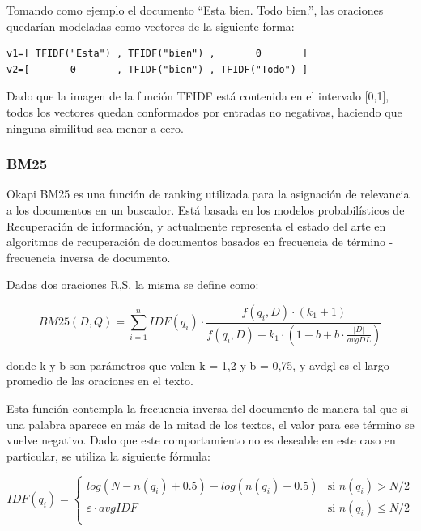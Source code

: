 \documentclass[a4paper]{article}
\begin{document}
Tomando como ejemplo el documento “Esta bien. Todo bien.”, las oraciones quedarían modeladas como vectores de la siguiente forma:

\begin{Verbatim}[xleftmargin=3em]
v1=[ TFIDF("Esta") , TFIDF("bien") ,       0       ]
v2=[       0       , TFIDF("bien") , TFIDF("Todo") ]
\end{Verbatim}

Dado que la imagen de la función TFIDF está contenida en el intervalo [0,1], todos los vectores quedan conformados por entradas no negativas, haciendo que ninguna similitud sea menor a cero. 


\subsubsection{BM25}
Okapi BM25 es una función de ranking utilizada para la asignación de relevancia a los documentos en un buscador. Está basada en los modelos probabilísticos de Recuperación de información, y actualmente representa el estado del arte en algoritmos de recuperación de documentos basados en frecuencia de término - frecuencia inversa de documento.

Dadas dos oraciones R,S, la misma se define como:

\begin{equation}
BM25(D,Q) = \sum_{i=1}^{n} IDF(q_i) \cdot \frac{f(q_i, D) \cdot (k_1 + 1)}{f(q_i, D) + k_1 \cdot (1 - b + b \cdot \frac{|D|}{avgDL})}
\end{equation}

donde k y b son parámetros que valen k = 1,2 y b = 0,75, y avdgl es el largo promedio de las oraciones en el texto.

Esta función contempla la frecuencia inversa del documento de manera tal que si una palabra aparece en más de la mitad de los textos, el valor para ese término se vuelve negativo. Dado que este comportamiento no es deseable en este caso en particular, se utiliza la siguiente fórmula:
                
\begin{equation}
 IDF(q_i) =
  \begin{cases}
       log(N - n(q_i) + 0.5) - log(n(q_i) + 0.5)    & \text{si }  n(q_i) > N/2\\
       \varepsilon \cdot avgIDF                     & \text{si }  n(q_i) \leq N/2\\
  \end{cases}
\end{equation}                
                
\end{document}
